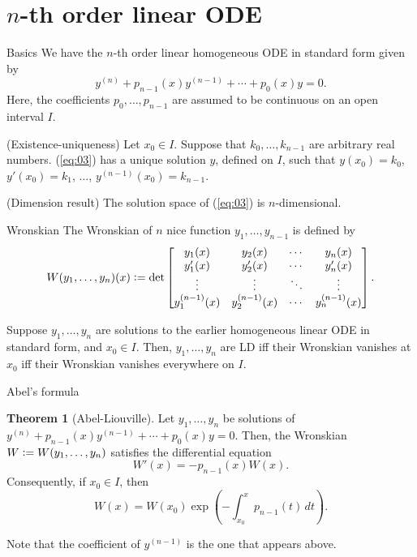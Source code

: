 \documentclass[dvipsnames]{beamer}
\theoremstyle{definition}
\newtheorem{thm}{Theorem}
\begin{document}
\section{\texorpdfstring{$n$}{n}-th order linear ODE}
\begin{frame}{Basics}
  We have the $n$-th order linear homogeneous ODE in standard form given by
  \begin{equation} \label{eq:03}
    y^{(n)} + p_{n - 1}(x) y^{(n - 1)} + \cdots + p_{0}(x) y = 0.
  \end{equation} \pause
  Here, the coefficients $p_{0}, \ldots, p_{n - 1}$ are assumed to be continuous on an open interval $I$. \pause 

  (Existence-uniqueness) Let $x_{0} \in I$. \pause Suppose that $k_{0}, \ldots, k_{n - 1}$ are arbitrary real numbers. \pause (\ref{eq:03}) has a unique solution $y$, defined on $I$, such that $y(x_{0}) = k_{0}$, $y'(x_{0}) = k_{1}$, $\ldots$, $y^{(n - 1)}(x_{0}) = k_{n - 1}$. \pause

  (Dimension result) The solution space of (\ref{eq:03}) is $n$-dimensional. 
\end{frame}
\begin{frame}{Wronskian}
  The Wronskian of $n$ nice function $y_{1}, \ldots, y_{n - 1}$ is defined by
  \begin{equation*} 
    W(y_{1}, \ldots, y_{n})(x) \vcentcolon= 
    \det\begin{bmatrix}
      y_{1}(x) & y_{2}(x) & \cdots & y_{n}(x) \\
      y_{1}'(x) & y_{2}'(x) & \cdots & y_{n}'(x) \\
      \vdots & \vdots & \ddots & \vdots \\
      y_{1}^{(n - 1)}(x) & y_{2}^{(n - 1)}(x) & \cdots & y_{n}^{(n - 1)}(x) \\
    \end{bmatrix}.
  \end{equation*} \pause

  Suppose $y_{1}, \ldots, y_{n}$ are solutions to the earlier homogeneous linear ODE in standard form, and $x_{0} \in I$. \pause Then, $y_{1}, \ldots, y_{n}$ are LD iff their Wronskian vanishes at $x_{0}$ iff their Wronskian vanishes everywhere on $I$.
\end{frame}
\begin{frame}{Abel's formula}
  \begin{thm}[Abel-Liouville]
    Let $y_{1}, \ldots, y_{n}$ be solutions of $y^{(n)} + p_{n - 1}(x) y^{(n - 1)} + \cdots + p_{0}(x) y = 0$. \pause Then, the Wronskian $W \vcentcolon= W(y_{1}, \ldots, y_{n})$ satisfies the differential equation \pause 
    \begin{equation*} 
      W'(x) = -p_{n - 1}(x) W(x).
    \end{equation*}
    \pause Consequently, if $x_{0} \in I$, then
    \begin{equation*} 
      W(x) = W(x_{0}) \exp\left(-\int_{x_{0}}^{x} p_{n - 1}(t) \,dt\right).
    \end{equation*}
  \end{thm} \pause

  Note that the coefficient of $y^{(n - 1)}$ is the one that appears above. 
\end{frame}
\end{document}
